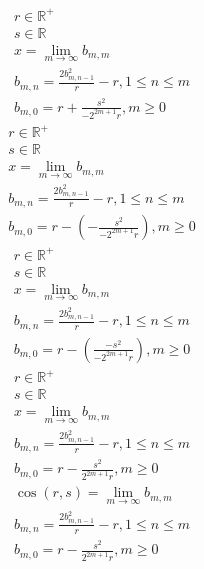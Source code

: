 \documentclass[a4paper,12pt]{report}
\begin{document}
\begin{subequations}
\begin{gather}
r \in \mathbb{R}^+ \\
s \in \mathbb{R} \\
x = \lim \limits_{m \to \infty} b_{m,m} \\
b_{m,n} = \frac{2b_{m,n-1}^2}{r} - r, 1 \leq n \leq m \\
b_{m,0} = r + \frac{s^2}{-2^{2m+1}r}, m \geq 0
\end{gather}
\end{subequations}
\begin{subequations}
\begin{gather}
r \in \mathbb{R}^+ \\
s \in \mathbb{R} \\
x = \lim \limits_{m \to \infty} b_{m,m} \\
b_{m,n} = \frac{2b_{m,n-1}^2}{r} - r, 1 \leq n \leq m \\
b_{m,0} = r - \left(-\frac{s^2}{-2^{2m+1}r}\right), m \geq 0
\end{gather}
\end{subequations}
\begin{subequations}
\begin{gather}
r \in \mathbb{R}^+ \\
s \in \mathbb{R} \\
x = \lim \limits_{m \to \infty} b_{m,m} \\
b_{m,n} = \frac{2b_{m,n-1}^2}{r} - r, 1 \leq n \leq m \\
b_{m,0} = r - \left(\frac{-s^2}{-2^{2m+1}r}\right), m \geq 0
\end{gather}
\end{subequations}
\begin{subequations}
\begin{gather}
r \in \mathbb{R}^+ \\
s \in \mathbb{R} \\
x = \lim \limits_{m \to \infty} b_{m,m} \\
b_{m,n} = \frac{2b_{m,n-1}^2}{r} - r, 1 \leq n \leq m \\
b_{m,0} = r - \frac{s^2}{2^{2m+1}r}, m \geq 0
\end{gather}
\end{subequations}
\begin{subequations}
\begin{gather}
\cos(r,s) = \lim \limits_{m \to \infty} b_{m,m} \\
b_{m,n} = \frac{2b_{m,n-1}^2}{r} - r, 1 \leq n \leq m \\
b_{m,0} = r - \frac{s^2}{2^{2m+1}r}, m \geq 0
\end{gather}
\end{subequations}
\end{document}
